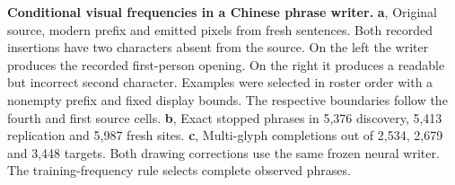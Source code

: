 \textbf{Conditional visual frequencies in a Chinese phrase writer.}
\textbf{a}, Original source, modern prefix and emitted pixels from fresh sentences. Both recorded insertions have two characters absent from the source. On the left the writer produces the recorded first-person opening. On the right it produces a readable but incorrect second character. Examples were selected in roster order with a nonempty prefix and fixed display bounds. The respective boundaries follow the fourth and first source cells.
\textbf{b}, Exact stopped phrases in 5,376 discovery, 5,413 replication and 5,987 fresh sites. \textbf{c}, Multi-glyph completions out of 2,534, 2,679 and 3,448 targets. Both drawing corrections use the same frozen neural writer. The training-frequency rule selects complete observed phrases.
